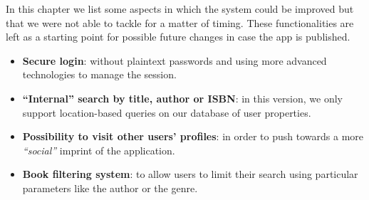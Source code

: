 In this chapter we list some aspects in which the system could be improved but that we were not able to tackle for a matter of timing.
These functionalities are left as a starting point for possible future changes in case the app is published.

\begin{itemize}
      \item \textbf{Secure login}: without plaintext passwords and using more advanced technologies to manage the session.
      \item \textbf{``Internal'' search by title, author or ISBN}: in this version, we only support location-based queries on our database of user properties.
      \item \textbf{Possibility to visit other users' profiles}: in order to push towards a more \emph{``social''} imprint of the application.
      \item \textbf{Book filtering system}: to allow users to limit their search using particular parameters like the author or the genre.
\end{itemize}

